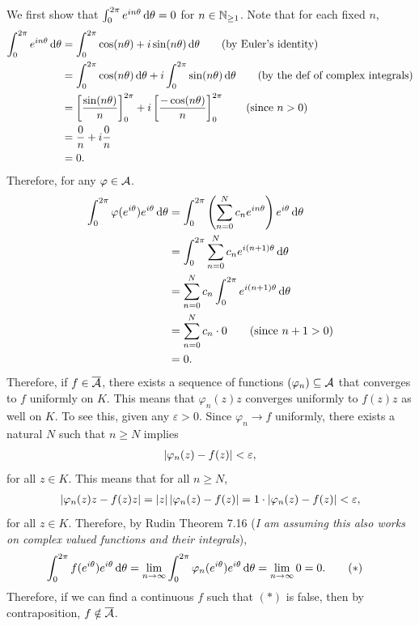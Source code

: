 \documentclass[12pt]{article}
\begin{document}
\begin{fproof}[5]
We first show that \(\int_{0}^{2 \pi} e^{i n \theta} \mathop{}\!\mathrm{d}\theta = 0\) for \(n \in \mathbb {N}_{\geq 1}\).
Note that for each fixed \(n\),
\begin{align*}
    \int_{0}^{2 \pi} e^{i n \theta} \mathop{}\!\mathrm{d}\theta 
    & = \int_{0}^{2 \pi} \cos(n \theta) + i \sin(n \theta) \mathop{}\!\mathrm{d}\theta \tag{by Euler's identity} \\
    &= \int_{0}^{2 \pi} \cos(n \theta) \mathop{}\!\mathrm{d}\theta + i \int_{0}^{2 \pi} \sin(n \theta) \mathop{}\!\mathrm{d}\theta \tag{by the def of complex integrals}\\
    &= \left[ \frac{\sin(n \theta)}{n} \right]_{0}^{2 \pi} + i \left[ \frac{-\cos(n \theta)}{n} \right]_{0}^{2 \pi} \tag{since \(n > 0\)}\\
    &= \frac{0}{n} + i \frac{0}{n}\\
    &=0.
\end{align*}
Therefore, for any \(\varphi \in \mathcal{A}\).
\begin{align*}
    \int_{0}^{2 \pi} \varphi(e^{i  \theta})e^{i \theta} \mathop{}\!\mathrm{d}\theta
    &= \int_{0}^{2 \pi} \left( \sum_{n=0}^{N} c_ne^{in \theta} \right)e^{i \theta} \mathop{}\!\mathrm{d}\theta\\
    &= \int_{0}^{2 \pi} \sum_{n=0}^{N} c_n e^{i (n+1) \theta} \mathop{}\!\mathrm{d}\theta\\
    &= \sum_{n=0}^{N} c_n \int_{0}^{2 \pi} e^{i (n+1) \theta} \mathop{}\!\mathrm{d}\theta\\
    &= \sum_{n=0}^{N} c_n \cdot 0 \tag{since \(n+1 > 0\)}\\
    &= 0.
\end{align*}
Therefore, if \(f \in \overline{\mathcal{A}}\), there exists a sequence of functions \((\varphi_n) \subseteq \mathcal{A}\) that converges to \(f\) uniformly on \(K\).
This means that \(\varphi_n(z)z\) converges uniformly to \(f(z)z\) as well on \(K\).
To see this, given any \(\varepsilon > 0\).
Since \(\varphi_n \to f\) uniformly, there exists a natural \(N\) such that \(n \geq N\) implies
\begin{align*}
    \left\lvert \varphi_n(z) - f(z) \right\rvert < \varepsilon,
\end{align*}
for all \(z \in K\).
This means that for all \(n \geq N\),
\begin{align*}
    \left\lvert \varphi_n(z)z - f(z)z \right\rvert = \left\lvert z \right\rvert\left\lvert \varphi_n(z) - f(z) \right\rvert = 1 \cdot \left\lvert \varphi_n(z) - f(z) \right\rvert < \varepsilon,
\end{align*}
for all \(z \in K\).
Therefore, by Rudin Theorem 7.16 (\textit{I am assuming this also works on complex valued functions and their integrals}),
\begin{align*}
    \int_{0}^{2 \pi} f(e^{i  \theta})e^{i \theta} \mathop{}\!\mathrm{d}\theta
    &= \lim_{n \to \infty} \int_{0}^{2 \pi}  \varphi_n(e^{i  \theta})e^{i  \theta} \mathop{}\!\mathrm{d}\theta = \lim_{n \to \infty} 0 = 0. \tag{\(\ast\)}
\end{align*}
Therefore, if we can find a continuous \(f\) such that \((\ast)\) is false, then by contraposition, \(f \notin \overline{\mathcal{A}}\).


\end{fproof}
\end{document}
